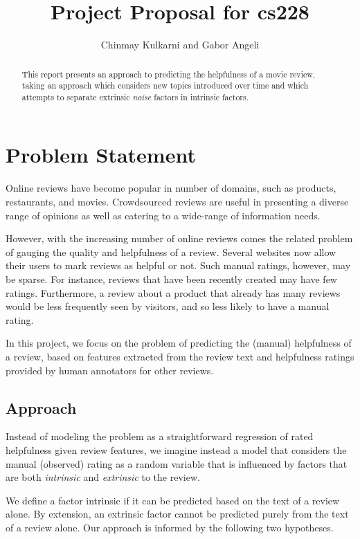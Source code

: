 \documentclass[letter,12pt]{article}
\title{Project Proposal for cs228}
\author{Chinmay Kulkarni and Gabor Angeli}
\begin{document}
\maketitle

\begin{abstract}
This report presents an approach to predicting the helpfulness of a 
	movie review, taking an approach which considers new topics introduced over time
	and which attempts to separate extrinsic {\em noise} factors in intrinsic factors.
\end{abstract}


\section{Problem Statement}
Online reviews have become popular in number of domains, such as products, restaurants, and movies. Crowdsourced reviews are useful in presenting a diverse range of opinions as well as catering to a wide-range of information needs. 

However, with the increasing number of online reviews comes the related problem of gauging the quality and helpfulness of a review. Several websites now allow their users to mark reviews as helpful or not. Such manual ratings, however, may be sparse. For instance, reviews that have been recently created may have few ratings. Furthermore, a review about a product that already has many reviews would be less frequently seen by visitors, and so less likely to have a manual rating.  

In this project, we focus on the problem of predicting the (manual) helpfulness of a review, based on features extracted from the review text and  helpfulness ratings provided by human annotators for other reviews. 


\subsection{Approach}
Instead of modeling the problem as a straightforward regression of rated helpfulness given review features, we imagine instead a model that considers the manual (observed) rating as a random variable that is influenced by factors that are both {\em intrinsic} and {\em extrinsic} to the review. 

We define a factor intrinsic if it can be predicted based on the text of a review alone. By extension, an extrinsic factor cannot be predicted purely from the text of a review alone. Our approach is informed by the following two hypotheses. 
\end{document}
